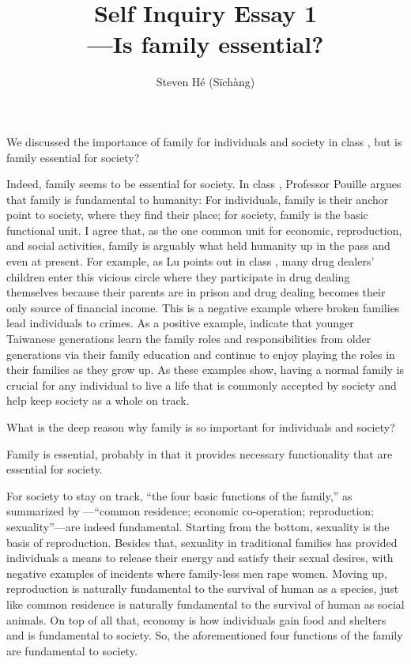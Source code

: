 \documentclass[12pt]{article}
\title{Self Inquiry Essay 1\\—Is family essential?}
\author{Steven Hé (Sīchàng)}
\begin{document}
\maketitle
We discussed the importance of family for individuals and society
in class \citep{pouille2023ethics},
but is family essential for society?

Indeed, family seems to be essential for society.
In class \citep{pouille2023ethics},
Professor Pouille argues that family is fundamental to humanity:
For individuals, family is their anchor point to society,
where they find their place;
for society, family is the basic functional unit.
I agree that, as the one common unit for economic, reproduction, and social
activities, family is arguably what held humanity up in the pass and even at
present.
For example, as Lu points out in class \citep{pouille2023ethics},
many drug dealers' children enter this vicious circle where
they participate in drug dealing themselves because their parents are in prison
and drug dealing becomes their only source of financial income.
This is a negative example where broken families lead individuals to crimes.
As a positive example, \citet{lu1998family} indicate that
younger Taiwanese generations learn the family roles and responsibilities from
older generations via their family education and
continue to enjoy playing the roles in their families as they grow up.
As these examples show, having a normal family is crucial for any individual to
live a life that is commonly accepted by society and help keep society as a
whole on track.

What is the deep reason why family is so important for individuals and society?

Family is essential, probably in that it provides necessary functionality
that are essential for society.

For society to stay on track, ``the four basic functions of the family,''
as summarized by \citet[p. 60]{gittins1993family}—``common residence;
economic co-operation; reproduction; sexuality''—are indeed fundamental.
Starting from the bottom, sexuality is the basis of reproduction.
Besides that, sexuality in traditional families has provided individuals
a means to release their energy and satisfy their sexual desires,
with negative examples of incidents where family-less men rape women.
Moving up, reproduction is naturally fundamental to the survival of human as
a species, just like common residence is naturally fundamental to the survival
of human as social animals.
On top of all that, economy is how individuals gain food and shelters and
is fundamental to society.
So, the aforementioned four functions of the family are fundamental to society.
\end{document}
